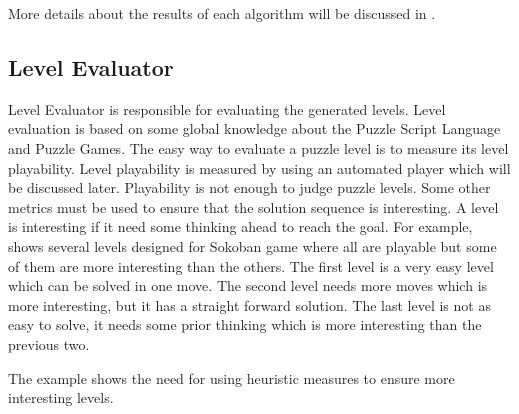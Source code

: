More details about the results of each algorithm will be discussed in .

\subsection{Level Evaluator}
Level Evaluator is responsible for evaluating the generated levels. Level evaluation is based on some global knowledge about the Puzzle Script Language and Puzzle Games. The easy way to evaluate a puzzle level is to measure its level playability. Level playability is measured by using an automated player which will be discussed later. Playability is not enough to judge puzzle levels. Some other metrics must be used to ensure that the solution sequence is interesting. A level is interesting if it need some thinking ahead to reach the goal. For example,  shows several levels designed for Sokoban game where all are playable but some of them are more interesting than the others. The first level is a very easy level which can be solved in one move. The second level needs more moves which is more interesting, but it has a straight forward solution. The last level is not as easy to solve, it needs some prior thinking which is more interesting than the previous two.


The example shows the need for using heuristic measures to ensure more interesting levels.

